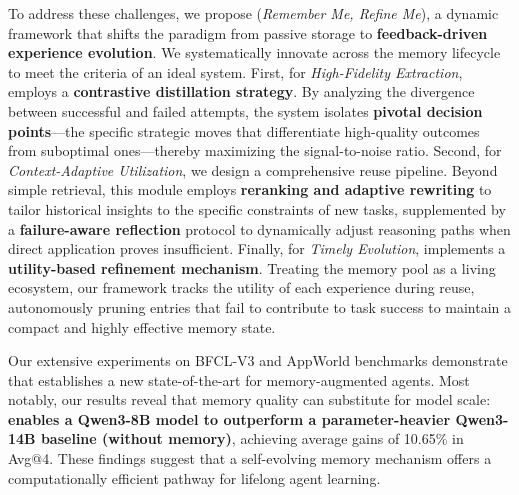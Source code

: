To address these challenges, we propose \textbf{\ours} (\textit{Remember Me, Refine Me}), a dynamic framework that shifts the paradigm from passive storage to \textbf{feedback-driven experience evolution}. 
We systematically innovate across the memory lifecycle to meet the criteria of an ideal system.
First, for \textit{High-Fidelity Extraction}, {\ours} employs a \textbf{contrastive distillation strategy}. By analyzing the divergence between successful and failed attempts, the system isolates \textbf{pivotal decision points}—the specific strategic moves that differentiate high-quality outcomes from suboptimal ones—thereby maximizing the signal-to-noise ratio.
Second, for \textit{Context-Adaptive Utilization}, we design a comprehensive reuse pipeline. Beyond simple retrieval, this module employs \textbf{reranking and adaptive rewriting} to tailor historical insights to the specific constraints of new tasks, supplemented by a \textbf{failure-aware reflection} protocol to dynamically adjust reasoning paths when direct application proves insufficient.
Finally, for \textit{Timely Evolution}, {\ours} implements a \textbf{utility-based refinement mechanism}. Treating the memory pool as a living ecosystem, our framework tracks the utility of each experience during reuse, autonomously pruning entries that fail to contribute to task success to maintain a compact and highly effective memory state.

Our extensive experiments on BFCL-V3 and AppWorld benchmarks demonstrate that {\ours} establishes a new state-of-the-art for memory-augmented agents. 
Most notably, our results reveal that memory quality can substitute for model scale: \textbf{{\ours} enables a Qwen3-8B model to outperform a parameter-heavier Qwen3-14B baseline (without memory)}, achieving average gains of 10.65\% in Avg@4. 
These findings suggest that a self-evolving memory mechanism offers a computationally efficient pathway for lifelong agent learning.

